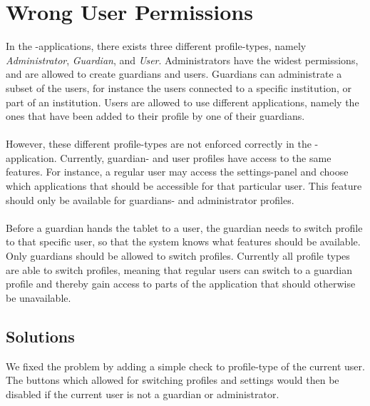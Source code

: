 \section{Wrong User Permissions}
\label{sec:wrong_user_permissions}

In the \giraf-applications, there exists three different profile-types, namely \emph{Administrator}, \emph{Guardian}, and \emph{User}. Administrators have the widest permissions, and are allowed to create guardians and users. Guardians can administrate a subset of the users, for instance the users connected to a specific institution, or part of an institution. Users are allowed to use different applications, namely the ones that have been added to their profile by one of their guardians. 
\\\\
However, these different profile-types are not enforced correctly in the \launcher-application. Currently, guardian- and user profiles have access to the same features. For instance, a regular user may access the settings-panel and choose which applications that should be accessible for that particular user. This feature should only be available for guardians- and administrator profiles.
\\\\
Before a guardian hands the tablet to a user, the guardian needs to switch profile to that specific user, so that the system knows what features should be available. Only guardians should be allowed to switch profiles. Currently all profile types are able to switch profiles, meaning that regular users can switch to a guardian profile and thereby gain access to parts of the application that should otherwise be unavailable.

\subsection{Solutions}
\label{sub:wrong_user_permissions_solutions}

We fixed the problem by adding a simple check to profile-type of the current user. The buttons which allowed for switching profiles and settings would then be disabled if the current user is not a guardian or administrator.